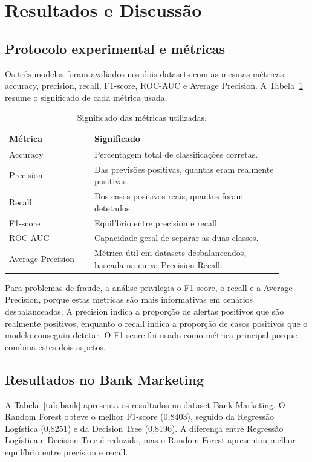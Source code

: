 \documentclass[10pt,twocolumn]{article}
\begin{document}
\section{Resultados e Discussão}
\subsection{Protocolo experimental e métricas}
Os três modelos foram avaliados nos dois datasets com as mesmas métricas: accuracy, precision, recall, F1-score, ROC-AUC e Average Precision. A Tabela~\ref{tab:metricas} resume o significado de cada métrica usada.

\begin{table}[H]
\centering
\caption{Significado das métricas utilizadas.}
\label{tab:metricas}
\scriptsize
\begin{tabular}{p{0.28\linewidth}p{0.62\linewidth}}
\toprule
Métrica & Significado \\
\midrule
Accuracy & Percentagem total de classificações corretas. \\
Precision & Das previsões positivas, quantas eram realmente positivas. \\
Recall & Dos casos positivos reais, quantos foram detetados. \\
F1-score & Equilíbrio entre precision e recall. \\
ROC-AUC & Capacidade geral de separar as duas classes. \\
Average Precision & Métrica útil em datasets desbalanceados, baseada na curva Precision-Recall. \\
\bottomrule
\end{tabular}
\end{table}

Para problemas de fraude, a análise privilegia o F1-score, o recall e a Average Precision, porque estas métricas são mais informativas em cenários desbalanceados. A precision indica a proporção de alertas positivos que são realmente positivos, enquanto o recall indica a proporção de casos positivos que o modelo conseguiu detetar. O F1-score foi usado como métrica principal porque combina estes dois aspetos.

\subsection{Resultados no Bank Marketing}
A Tabela~\ref{tab:bank} apresenta os resultados no dataset Bank Marketing. O Random Forest obteve o melhor F1-score (0,8403), seguido da Regressão Logística (0,8251) e da Decision Tree (0,8196). A diferença entre Regressão Logística e Decision Tree é reduzida, mas o Random Forest apresentou melhor equilíbrio entre precision e recall.
\end{document}
